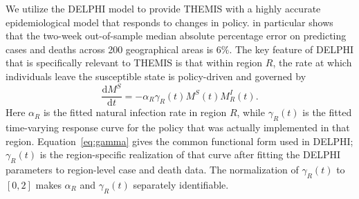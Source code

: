 \documentclass[msom,blindrev]{informs3} %
\renewcommand{\d}{\mathrm{d}}
\begin{document}
{\color{blue}
We utilize the DELPHI model to provide THEMIS with a highly accurate epidemiological model that responds to changes in policy.  in particular shows that the two-week out-of-sample median absolute percentage error on predicting cases and deaths across 200 geographical areas is $6\%$. The key feature of DELPHI that is specifically relevant to THEMIS is that within region $R$, the rate at which individuals leave the susceptible state is policy-driven and governed by
\begin{equation}
    \frac{\d M^{S}}{\d t} = -\alpha_R \gamma_R(t) M^S(t)M^I_R(t).\label{eq:S}
\end{equation}
Here $\alpha_R$ is the fitted natural infection rate in region $R$, while $\gamma_R(t)$ is the fitted time-varying response curve for the policy that was actually implemented in that region. Equation~\eqref{eq:gamma} gives the common functional form used in DELPHI; $\gamma_R(t)$ is the region-specific realization of that curve after fitting the DELPHI parameters to region-level case and death data. The normalization of $\gamma_R(t)$ to $[0,2]$ makes $\alpha_R$ and $\gamma_R(t)$ separately identifiable.

}
\end{document}
